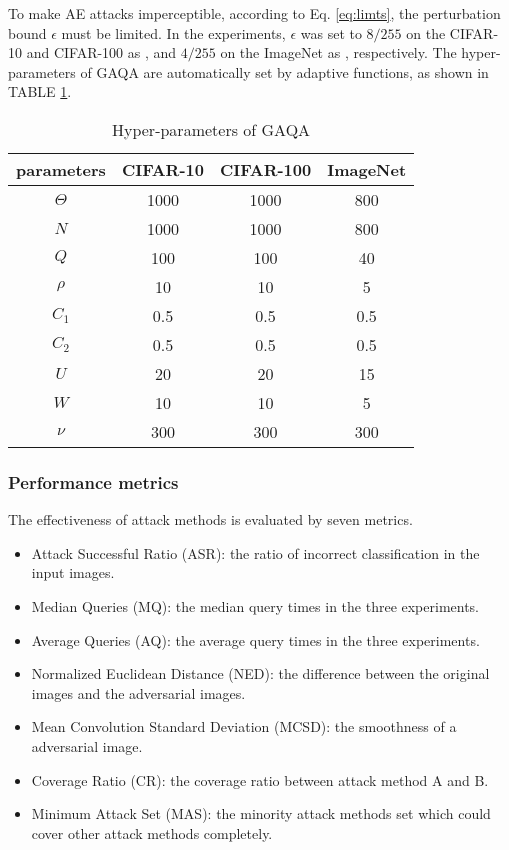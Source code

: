 \documentclass[lettersize,journal]{IEEEtran}
\begin{document}
	
	To make AE attacks imperceptible, according to Eq. \ref{eq:limts}, the perturbation bound $\epsilon$ must be limited. In the experiments, $\epsilon$ was set to $8/255$ on the CIFAR-10 and CIFAR-100 as \cite{wang2020mgaattack}, and $4/255$ on the ImageNet as \cite{croce2021robustbench}, respectively. The hyper-parameters of GAQA are automatically set by adaptive functions, as shown in TABLE \ref{tab:parameters}. 
	
	\begin{table}[t]
		\centering
		\caption{Hyper-parameters of GAQA}
		\begin{tabular}{cccc}
			\toprule
			parameters & \multicolumn{1}{c}{CIFAR-10} & \multicolumn{1}{c}{CIFAR-100} & \multicolumn{1}{c}{ImageNet} \\
			\midrule
			$\Theta$ & 1000   & 1000   & 800 \\
			$N$     & 1000  & 1000  & 800 \\
			$Q$	 & 100    & 100    & 40 \\
			$\rho$ & 10    & 10    & 5 \\
			$C_1$    & 0.5   & 0.5   & 0.5 \\
			$C_2$    & 0.5   & 0.5   & 0.5 \\
			$U$ & 20    & 20    & 15 \\
			$W$ & 10    & 10    & 5 \\
			$\nu$ & 300    & 300    & 300 \\
			\bottomrule
		\end{tabular}%
		\label{tab:parameters}
	\end{table}
	
	\subsubsection{Performance metrics}
	The effectiveness of attack methods is evaluated by seven metrics.
	\begin{itemize}
		\item Attack Successful Ratio (ASR): the ratio of incorrect classification in the input images. 
		\item Median Queries (MQ):  the median query times in the three experiments.
		\item Average Queries (AQ): the average query times in the three experiments.
		\item Normalized Euclidean Distance (NED): the difference between the original images and the adversarial images.
		\item Mean Convolution Standard Deviation (MCSD): the smoothness of a adversarial image.  
		\item Coverage Ratio (CR): the coverage ratio between attack method A and B.  
		\item Minimum Attack Set (MAS): the minority attack methods set which could cover other attack methods completely. %
	\end{itemize} 
	
\end{document}
